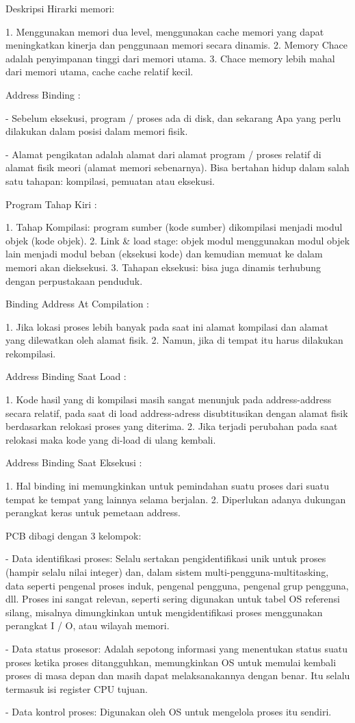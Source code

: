 Deskripsi Hirarki memori:

1. Menggunakan memori dua level, menggunakan cache memori yang dapat meningkatkan kinerja dan penggunaan memori secara dinamis.
2. Memory Chace adalah penyimpanan tinggi dari memori utama.
3. Chace memory lebih mahal dari memori utama, cache cache relatif kecil.


Address Binding :

- Sebelum eksekusi, program / proses ada di disk, dan sekarang Apa yang perlu dilakukan dalam posisi dalam memori fisik.

- Alamat pengikatan adalah alamat dari alamat program / proses relatif di alamat fisik meori (alamat memori sebenarnya). Bisa bertahan hidup dalam salah satu tahapan: kompilasi, pemuatan atau eksekusi.


Program Tahap Kiri :

1. Tahap Kompilasi: program sumber (kode sumber) dikompilasi menjadi modul objek (kode objek).
2. Link & load stage: objek modul menggunakan modul objek lain menjadi modul beban (eksekusi kode) dan kemudian memuat ke dalam memori akan dieksekusi.
3. Tahapan eksekusi: bisa juga dinamis terhubung dengan perpustakaan penduduk.

Binding Address At Compilation :

1. Jika lokasi proses lebih banyak pada saat ini alamat kompilasi dan alamat yang dilewatkan oleh alamat fisik.
2. Namun, jika di tempat itu harus dilakukan rekompilasi.

Address Binding Saat Load :

1. Kode hasil yang di kompilasi masih sangat menunjuk pada address-address secara relatif, pada saat di load address-adress disubtitusikan dengan alamat fisik berdasarkan relokasi proses yang diterima.
2. Jika terjadi perubahan pada saat relokasi maka kode yang di-load di ulang kembali.

Address Binding Saat Eksekusi :

1. Hal binding ini memungkinkan untuk pemindahan suatu proses dari suatu tempat ke tempat yang lainnya selama berjalan.
2. Diperlukan adanya dukungan perangkat keras untuk pemetaan address.

PCB dibagi dengan 3 kelompok:

- Data identifikasi proses: Selalu sertakan pengidentifikasi unik untuk proses (hampir selalu nilai integer) dan, dalam sistem multi-pengguna-multitasking, data seperti pengenal proses induk, pengenal pengguna, pengenal grup pengguna, dll. Proses ini sangat relevan, seperti sering digunakan untuk tabel OS referensi silang, misalnya dimungkinkan untuk mengidentifikasi proses menggunakan perangkat I / O, atau wilayah memori.

- Data status prosesor: Adalah sepotong informasi yang menentukan status suatu proses ketika proses ditangguhkan, memungkinkan OS untuk memulai kembali proses di masa depan dan masih dapat melaksanakannya dengan benar. Itu selalu termasuk isi register CPU tujuan.

- Data kontrol proses: Digunakan oleh OS untuk mengelola proses itu sendiri.

